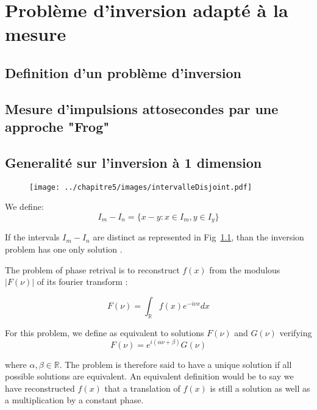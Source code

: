 \chapter{Problème d'inversion adapté à la mesure}
\minitoc

\section{Definition d'un problème d'inversion}


\section{Mesure d'impulsions attosecondes par une approche "Frog"}


\section{Generalité sur l'inversion à 1 dimension}

\begin{figure}[!h]
\centering
\texttt{[image: ../chapitre5/images/intervalleDisjoint.pdf]}\\
\caption{\label{fig:intervalleDisjoint}}
\end{figure}

We define:
\begin{equation}
I_m - I_n=\{  x-y: x\in I_m,y\in I_y \}
\end{equation}

If the intervals $I_m - I_n$ are distinct as represented in Fig~\ref{fig:intervalleDisjoint}, than the inversion problem has one only solution \cite{crimmins1983uniqueness}.


The problem of phase retrival is to reconstruct $f(x)$ from the modulous $|F(\nu)|$ of its fourier transform :

\begin{equation}
F(\nu) = \int_{\mathbb{R}}f(x)e^{-i\nu x}dx
\end{equation}

For this problem, we define as equivalent to solutions $F(\nu)$ and $G(\nu)$ verifying
\begin{equation}
F(\nu) = e^{i(\alpha \nu+\beta)}G(\nu)
\end{equation}

where $\alpha,\beta \in \mathbb{R}$. The problem is therefore said to have a unique solution if all possible solutions are equivalent. An equivalent definition would be to say we have reconstructed $f(x)$ that a translation of $f(x)$ is still a solution as well as a multiplication by a constant phase. 

